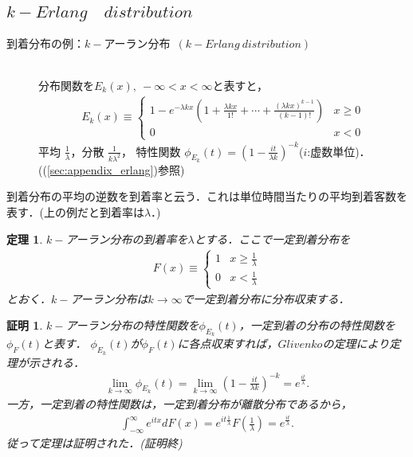 \documentclass[a4j,papersize,disablejfam,slide,14pt]{jsarticle}
\newtheorem{Prop}{定理}
\newtheorem{Proof}{証明}
\def\qed{{(証明終)}} %
\def\exp#1{e^{#1}} %
\begin{document}
\subsection{$k-Erlang\quad distribution$}
	\begin{description}
    	\item[到着分布の例：$k-$アーラン分布\ $(k-Erlang\ distribution)$]\mbox{}\\
    		分布関数を$E_k(x),\ -\infty < x < \infty$と表すと，
    		\begin{align}
    			E_k(x) \equiv
        		\begin{cases}
        			1 - \exp{-\lambda k x} \left( 1 + \frac{\lambda k x}{1!} + \cdots + \frac{(\lambda k x)^{k-1}}{(k-1)!} \right) & \text{$x \geq 0$}\\
    				0 & \text{$x < 0$}
        		\end{cases}
    		\end{align}
            平均 $\frac{1}{\lambda}$，分散 $\frac{1}{k\lambda^2}$，
            特性関数 $\phi_{E_k}(t) = \left( 1 - \frac{it}{\lambda k} \right)^{-k}$($i$:虚数単位)．((\ref{sec:appendix_erlang})参照)
    \end{description}
    到着分布の平均の逆数を到着率と云う．これは単位時間当たりの平均到着客数を表す．(上の例だと到着率は$\lambda$．) \\
	\begin{screen}
    	\begin{Prop}
        	$k-$アーラン分布の到着率を$\lambda$とする．ここで一定到着分布を
            \begin{align}
            	F(x) \equiv
                \begin{cases}
                	1 & \text{$x \geq \frac{1}{\lambda}$}\\
                    0 & \text{$x < \frac{1}{\lambda}$}
                \end{cases}
            \end{align}
            とおく．$k-$アーラン分布は$k \rightarrow \infty$で一定到着分布に分布収束する．
        \end{Prop}
    \end{screen}
    \begin{Proof}
    	$k-$アーラン分布の特性関数を$\phi_{E_k}(t)$，一定到着の分布の特性関数を$\phi_{F}(t)$と表す．
        $\phi_{E_k}(t)$が$\phi_{F}(t)$に各点収束すれば，$Glivenko$の定理により定理が示される．
        \begin{align}
        	\lim_{k \to \infty} \phi_{E_k}(t) = \lim_{k \to \infty} \left( 1 - \frac{it}{\lambda k} \right)^{-k} 
            = \exp{\frac{it}{\lambda}}.
        \end{align}
        一方，一定到着の特性関数は，一定到着分布が離散分布であるから，
        \begin{align}
        	\int_{-\infty}^{\infty} \exp{itx} dF(x) = \exp{it\frac{1}{\lambda}} F\left(\frac{1}{\lambda}\right) = \exp{\frac{it}{\lambda}}.
        \end{align}
        従って定理は証明された．\qed
    \end{Proof}
\end{document}
